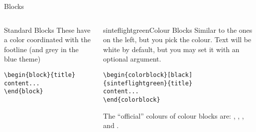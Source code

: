 \begin{frame}[fragile]{Blocks}
\begin{columns}
\begin{column}{0.3\textwidth}
\begin{block}{Standard Blocks}
These have a color coordinated with the footline (and grey in the blue theme)
\begin{verbatim}
\begin{block}{title}
content...
\end{block}
\end{verbatim}
\end{block}
\end{column}
\begin{column}{0.7\textwidth}
\begin{colorblock}[black]{sinteflightgreen}{Colour Blocks}
Similar to the ones on the left, but you pick the colour. Text will be white by 
default, but you may set it with an optional argument.
\small
\begin{verbatim}
\begin{colorblock}[black]{sinteflightgreen}{title}
content...
\end{colorblock}
\end{verbatim}
\end{colorblock}
The ``official'' colours of colour blocks are: , 
, , and 
.
\end{column}
\end{columns}
\end{frame}

